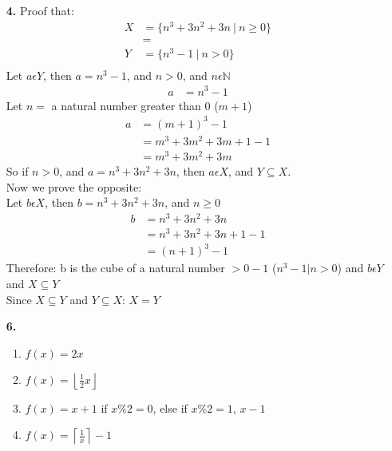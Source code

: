 \documentclass[]{article}
\begin{document}
\begin{flushleft}
\begin{enumerate}
	
	\item [\textbf{4.}] 
	Proof that:
\begin{align*}
	X&= \{n^3+3n^2+3n\ |\ n \ge 0\}\\
	&=\\
	Y&= \{n^3-1\ |\ n > 0\}\\
\end{align*}
Let $a \epsilon Y$, then $a=n^3-1$, and $n>0$, and $n\epsilon \mathbb{N}$
\begin{align*}
	a&=n^3-1
\end{align*}
Let $n = $ a natural number greater than 0 ($m+1$)\\
\begin{align*}
	a&=(m+1)^3 - 1 \\
	&= m^3 + 3m^2 + 3m + 1 - 1\\
	&= m^3 + 3m^2 + 3m
\end{align*}
So if $n > 0$, and $a = n^3+3n^2+3n$, then $a\epsilon X$, and $Y\subseteq X$.\\
\bigskip
Now we prove the opposite:\\
Let $b\epsilon X$, then $b=n^3+3n^2+3n$, and $n\ge 0$
\begin{align*}
	b&=n^3+3n^2+3n\\
	&=n^3+3n^2+3n+1-1\\
	&=(n+1)^3-1
\end{align*}
Therefore: b is the cube of a natural number $>0 -1$ ($n^3-1 | n > 0$) and $b\epsilon Y$ and $X\subseteq Y$\\
Since $X\subseteq Y$ and $Y\subseteq X$: $X=Y$
\newpage
\item [\textbf{6.}]
	\begin{enumerate}
		\item $f(x) = 2x$
		\item $f(x) =  \left\lfloor\frac{1}{2}x\right\rfloor$
		\item $f(x) = x+1$ if $x\%2=0$, else if $x\%2=1$, $x-1$
		\item $f(x) = \left\lceil\frac{1}{x}\right\rceil -1$
	\end{enumerate}
\bigskip



\end{enumerate}
\end{flushleft}
\end{document}
